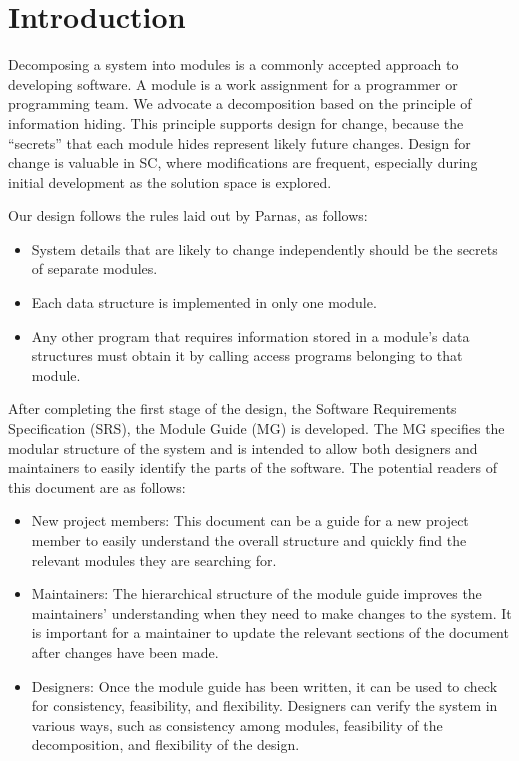 \documentclass[12pt, titlepage]{article}
\begin{document}
\newpage

\tableofcontents

\listoftables

\listoffigures

\newpage


\section{Introduction}

Decomposing a system into modules is a commonly accepted approach to developing
software.  A module is a work assignment for a programmer or programming
team.  We advocate a decomposition
based on the principle of information hiding.  This
principle supports design for change, because the ``secrets'' that each module
hides represent likely future changes.  Design for change is valuable in SC,
where modifications are frequent, especially during initial development as the
solution space is explored.  

Our design follows the rules laid out by Parnas, as follows:
\begin{itemize}
\item System details that are likely to change independently should be the
  secrets of separate modules.
\item Each data structure is implemented in only one module.
\item Any other program that requires information stored in a module's data
  structures must obtain it by calling access programs belonging to that module.
\end{itemize}

After completing the first stage of the design, the Software Requirements
Specification (SRS), the Module Guide (MG) is developed. The MG
specifies the modular structure of the system and is intended to allow both
designers and maintainers to easily identify the parts of the software.  The
potential readers of this document are as follows:

\begin{itemize}
\item New project members: This document can be a guide for a new project member
  to easily understand the overall structure and quickly find the
  relevant modules they are searching for.
\item Maintainers: The hierarchical structure of the module guide improves the
  maintainers' understanding when they need to make changes to the system. It is
  important for a maintainer to update the relevant sections of the document
  after changes have been made.
\item Designers: Once the module guide has been written, it can be used to
  check for consistency, feasibility, and flexibility. Designers can verify the
  system in various ways, such as consistency among modules, feasibility of the
  decomposition, and flexibility of the design.
\end{itemize}
\end{document}

